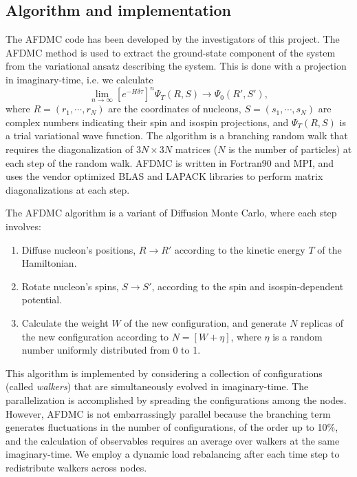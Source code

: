\documentclass[12pt,letterpaper]{article}
\begin{document}
\subsection{Algorithm and implementation}

The AFDMC code has been developed by the investigators of this project. The 
AFDMC method is used to extract the ground-state component of the system 
from the variational ansatz describing the system. This is done with a 
projection in imaginary-time, i.e. we calculate
\begin{equation}
\label{eq:dif}
\lim_{n\rightarrow\infty}\left[ e^{-H\delta\tau}\right]^n \Psi_T(R,S) 
\rightarrow \Psi_0(R',S'),
\end{equation}
where $R =(r_1, \cdots, r_N)$ are the coordinates of nucleons, $S = (s_1, 
\cdots, s_N)$ are complex numbers indicating their spin and isospin 
projections, and $\Psi_T(R,S)$ is a trial variational wave function. The 
algorithm is a branching random walk that requires the diagonalization of 
$3N \times 3N$ matrices ($N$ is the number of particles) at each step of the 
random walk. AFDMC is written in Fortran90 and MPI, and uses the vendor 
optimized BLAS and LAPACK libraries to perform matrix diagonalizations at 
each step.

The AFDMC algorithm is a variant of Diffusion Monte Carlo, where each step 
involves:
\begin{enumerate}
\item Diffuse nucleon’s positions, $R \rightarrow R'$ according to the 
kinetic energy $T$ of the Hamiltonian.
\item Rotate nucleon’s spins, $S \rightarrow S'$, according to the spin and 
isospin-dependent potential.
\item Calculate the weight $W$ of the new configuration, and generate $N$ 
replicas of the new configuration according to $N = [W + \eta]$, where 
$\eta$  is a random number uniformly distributed from 0 to 1.
\end{enumerate}

This algorithm is implemented by considering
a collection of configurations (called \textit{walkers})
that are simultaneously evolved in imaginary-time. The parallelization is 
accomplished
by spreading the configurations among the nodes. However, AFDMC is not 
embarrassingly parallel because the branching term generates fluctuations in 
the number of configurations, of the order up to 10\%, and the calculation 
of observables requires an average over walkers at the same imaginary-time. 
We employ a dynamic load rebalancing after
each time step to redistribute walkers across nodes.
\end{document}
